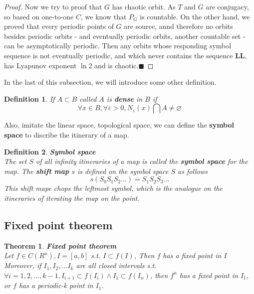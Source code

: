 \documentclass[12pt]{article}
\theoremstyle{plain}
\newtheorem{theorem}{\textbf{Theorem}}[section]
\newtheorem{definition}{\textbf{Definition}}[section]
\newtheorem{proof}{\textit{PROOF}}[section]
\begin{document}
{\color{blue}
\begin{proof} Now we try to proof that $G$ has chaotic orbit. As $T$ and $G$ are conjugacy, so based on one-to-one $C$, we know that $P_G$ is countable. On the other hand, we proved that every periodic points of $G$ are source, annd therefore no orbits besides periodic orbits - and eventually periodic orbits, another countable set - can be asymptotically periodic. Then any orbits whose responding symbol sequence is not eventually periodic, and which never contains the sequence \textbf{LL}, has Lyapunov exponent $\ln 2$ and is chaotic.$\blacksquare$
\end{proof}
}

In the last of this subsection, we will introduce some other definition.

\begin{definition} If $A \subset B$ called $A$ is \textbf{dense} in $B$ if 
$$
\forall x \in B, \forall \varepsilon > 0, N_\varepsilon(x) \bigcap A \neq \varnothing
$$
\end{definition}

Also, imitate the linear space, topological space, we can define the \textbf{symbol space} to discribe the itinerary of a map.
\newpage
\begin{definition} \textbf{Symbol space}
\\\noindent The set $S$ of all infinity itineraries of a map is called the \textbf{symbol space} for the map. The \textbf{shift map} $s$ is defined on the symbol space $S$ as follows
$$
s(S_0S_1S_2\ldots) = S_1S_2S_3\ldots
$$
This shift mape chops the leftmost symbol, which is the analogue on the itineraries of iterating the map on the point.
\end{definition}






\subsection{Fixed point theorem}
\begin{theorem} \label{Fixed-point-theo}\textbf{Fixed point theorem}
\\\noindent Let $f \in C(R^n), I = [a, b]$ s.t. $I \subset f(I)$, Then $f$ has a fixed point in $I$
\\\noindent Moreover, if $I_1, I_2, \ldots I_k$ are all closed intervals s.t. $\forall i = 1, 2, \ldots ,k -1,I_{i+1}\subset f(I_i)  \land I_1 \subset f(I_n)$, then $f^n$ has a fixed point in $I_1$, or $f$ has a periodic-k point in $I_1$.
\end{theorem}
\end{document}
